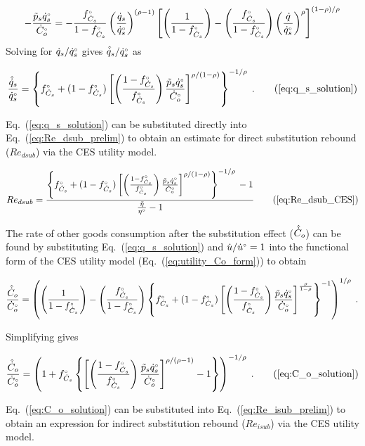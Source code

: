 \begin{equation}
  -\frac{\amacro{p}_s \rbempl{q}_s}
        {\rbempl{C}_o} = 
    -\frac{\fCs}{1 - \fCs} \left( \frac{\rate{q}_s}{\rbempl{q}_s} \right)^{(\rho -1)} %
        \left[ \left( \frac{1}{1 - \fCs} \right) 
                - \left( \frac{\fCs}{1 - \fCs} \right) 
                          \left( \frac{\rate{q}}{\rbempl{q}_s} \right)^\rho \right]^{(1 - \rho)/\rho}
\end{equation}
%
Solving for $\dot{q}_s/{}{\dot{q}}^{\scriptscriptstyle \circ}_s$ gives $\hat{\dot{q}}_s/{}{\dot{q}}^{\scriptscriptstyle \circ}_s$ as

\begin{equation}
  \frac{\rasub{q}_s}{\rbempl{q}_s} = \qssolution{} \; . \tag{\ref{eq:q_s_solution}}
\end{equation}

Eq.~(\ref{eq:q_s_solution}) can be substituted directly
into Eq.~(\ref{eq:Re_dsub_prelim})
to obtain an estimate for direct substitution rebound ($Re_{dsub}$)
via the CES utility model.

\begin{equation}
  Re_{dsub} = \RedsubCES{} \tag{\ref{eq:Re_dsub_CES}}
\end{equation}

The rate of other goods consumption after the substitution effect ($\hat{\dot{C}}_o$) 
can be found by substituting Eq.~(\ref{eq:q_s_solution}) and 
$\dot{u}/{}{\dot{u}}^{\scriptscriptstyle \circ} = 1$ 
into the functional form of the CES utility model (Eq.~(\ref{eq:utility_Co_form}))
to obtain

\begin{equation}
  \frac{\hat{\dot{C}}_o}{{}{\dot{C}}^{\scriptscriptstyle \circ}_o} = \left( \left( \frac{1}{1-{}{f}^{\scriptscriptstyle \circ}_{\dot{C}_s}} \right) 
                                     - \left( \frac{{}{f}^{\scriptscriptstyle \circ}_{\dot{C}_s}}{1-{}{f}^{\scriptscriptstyle \circ}_{\dot{C}_s}} \right)   
              \left\{ {}{f}^{\scriptscriptstyle \circ}_{\dot{C}_s} + (1-{}{f}^{\scriptscriptstyle \circ}_{\dot{C}_s})
                  \left[ \left( \frac{1-{}{f}^{\scriptscriptstyle \circ}_{\dot{C}_s}}{{}{f}^{\scriptscriptstyle \circ}_{\dot{C}_s}} \right) \frac{\tilde{p}_s {}{\dot{q}}^{\scriptscriptstyle \circ}_s}{{}{\dot{C}}^{\scriptscriptstyle \circ}_o}   \right] 
                      ^{\frac{\rho}{1-\rho}} \right\} ^{-1} \right) ^{1/\rho} \; .
\end{equation}

Simplifying gives

\begin{equation}
  \frac{\rasub{C}_o}{\rbempl{C}_o} = \Cosolution{} \; . \tag{\ref{eq:C_o_solution}}
\end{equation}

Eq.~(\ref{eq:C_o_solution}) can be substituted into Eq.~(\ref{eq:Re_isub_prelim})
to obtain an expression for indirect substitution rebound ($Re_{isub}$)
via the CES utility model.

